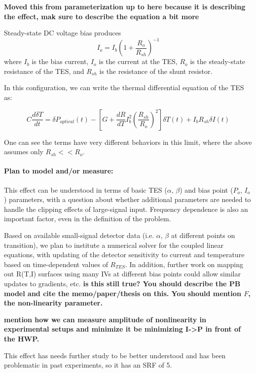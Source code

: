 \textbf{Moved this from parameterization up to here because it is describing the effect, mak sure to describe the equation a bit more}

Steady-state DC voltage bias produces
\begin{equation}
I_o = I_b ( 1+ \frac{R_o}{R_{sh}} )^{-1}
\end{equation}
where $I_b$ is the bias current, $I_o$ is the current at the TES, $R_o$ is the steady-state resistance of the TES, and $R_{sh}$ is the resistance of the shunt resistor.

In this configuration, we can write the thermal differential equation of the TES as:

\begin{equation}
C \frac{d \delta T}{dt} = \delta P_{optical}(t) - \left[ G + \frac{dR}{dT} I_b^2 \left(\frac{R_{sh}}{R_o}\right)^2\right] \delta T(t) + I_b R_{sh} \delta I(t)
\end{equation}

One can see the terms have very different behaviors in this limit, where the above assumes only $R_{sh} << R_o$.

\paragraph{Plan to model and/or measure:}

This effect can be understood in terms of basic TES ($\alpha$, $\beta$) and bias point ($P_o$, $I_o$) parameters, with a question about whether additional parameters are needed to handle the clipping effects of large-signal input. Frequency dependence is also an important factor, even in the definition of the problem.

Based on available small-signal detector data (i.e. $\alpha$, $\beta$ at different points on transition), we plan to institute a numerical solver for the coupled linear equations, with updating of the detector sensitivity to current and temperature based on time-dependent values of $R_{TES}$. In addition, further work on mapping out R(T,I) surfaces using many IVs at different bias points could allow similar updates to gradients, etc. \textbf{is this still true? You should describe the PB model and cite the memo/paper/thesis on this. You should mention $F$, the non-linearity parameter.}

\textbf{mention how we can measure amplitude of nonlinearity in experimental setups and minimize it be minimizing I->P in front of the HWP.}

This effect has needs further study to be better understood and has been problematic in past experiments, so it has an SRF of 5.

